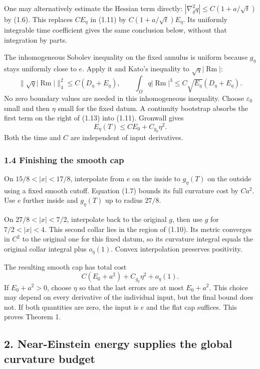 \documentclass[
  11pt,
]{article}
\begin{document}
One may alternatively estimate the Hessian term directly:
\(|\nabla_g^2q|\le C(1+a/\sqrt t)\) by (1.6). This replaces \(CE_\eta\)
in (1.11) by \(C(1+a/\sqrt t)E_\eta\). Its uniformly integrable time
coefficient gives the same conclusion below, without that integration by
parts.

The inhomogeneous Sobolev inequality on the fixed annulus is uniform
because \(g_\eta\) stays uniformly close to \(e\). Apply it and Kato's
inequality to \(\sqrt q|\operatorname{Rm}|\): \[
 \|\sqrt q|\operatorname{Rm}|\|_4^2
        \le C(D_\eta+E_\eta),\qquad
 \int_\Omega q|\operatorname{Rm}|^3
        \le C\sqrt{E_\eta}(D_\eta+E_\eta).             \tag{1.13}
\] No zero boundary values are needed in this inhomogeneous inequality.
Choose \(\varepsilon_0\) small and then \(\eta\) small for the fixed
datum. A continuity bootstrap absorbs the first term on the right of
(1.13) into (1.11). Gronwall gives \[
                     E_\eta(T)\le CE_0+C_{g_0}\eta^2. \tag{1.14}
\] Both the time and \(C\) are independent of input derivatives.

\hypertarget{finishing-the-smooth-cap}{%
\subsubsection{1.4 Finishing the smooth
cap}\label{finishing-the-smooth-cap}}

On \(15/8<|x|<17/8\), interpolate from \(e\) on the inside to
\(g_\eta(T)\) on the outside using a fixed smooth cutoff. Equation (1.7)
bounds its full curvature cost by \(Ca^2\). Use \(e\) further inside and
\(g_\eta(T)\) up to radius \(27/8\).

On \(27/8<|x|<7/2\), interpolate back to the original \(g\), then use
\(g\) for \(7/2<|x|<4\). This second collar lies in the region of
(1.10). Its metric converges in \(C^2\) to the original one for this
fixed datum, so its curvature integral equals the original collar
integral plus \(o_\eta(1)\). Convex interpolation preserves positivity.

The resulting smooth cap has total cost \[
 C(E_0+a^2)+C_{g_0}\eta^2+o_\eta(1).
\] If \(E_0+a^2>0\), choose \(\eta\) so that the last errors are at most
\(E_0+a^2\). This choice may depend on every derivative of the
individual input, but the final bound does not. If both quantities are
zero, the input is \(e\) and the flat cap suffices. This proves Theorem
1.

\hypertarget{near-einstein-energy-supplies-the-global-curvature-budget}{%
\subsection{2. Near-Einstein energy supplies the global curvature
budget}\label{near-einstein-energy-supplies-the-global-curvature-budget}}
\end{document}
